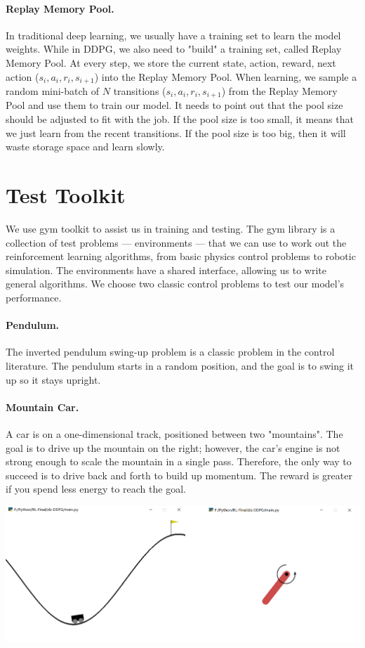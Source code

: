 \documentclass[a4paper,12pt,oneside,article]{memoir}
\newcommand{\mybold}[1]{\paragraph{#1.}} %
\begin{document}
\mybold{Replay Memory Pool}
In traditional deep learning, we usually have a training set to learn the model weights. While in DDPG, we also need to "build" a training set, called Replay Memory Pool. At every step, we store the current state, action, reward, next action ($s_i, a_i, r_i, s_{i+1}$) into the Replay Memory Pool. When learning, we sample a random mini-batch of $N$ transitions ($s_i, a_i, r_i, s_{i+1}$) from the Replay Memory Pool and use them to train our model. It needs to point out that the pool size should be adjusted to fit with the job. If the pool size is too small, it means that we just learn from the recent transitions. If the pool size is too big, then it will waste storage space and learn slowly.


\section{Test Toolkit}
We use gym toolkit to assist us in training and testing. The gym library is a collection of test problems — environments — that we can use to work out the reinforcement learning algorithms, from basic physics control problems to robotic simulation. The environments have a shared interface, allowing us to write general algorithms. We choose two classic control problems to test our model's performance.
\mybold{Pendulum} The inverted pendulum swing-up problem is a classic problem in the control literature. The pendulum starts in a random position, and the goal is to swing it up so it stays upright.
\mybold{Mountain Car} A car is on a one-dimensional track, positioned between two "mountains". The goal is to drive up the mountain on the right; however, the car's engine is not strong enough to scale the mountain in a single pass. Therefore, the only way to succeed is to drive back and forth to build up momentum. The reward is greater if you spend less energy to reach the goal.

\begin{center}
\includegraphics[width=15cm]{gym.png}
\label{fig:smiley}
\end{center}
\end{document}
